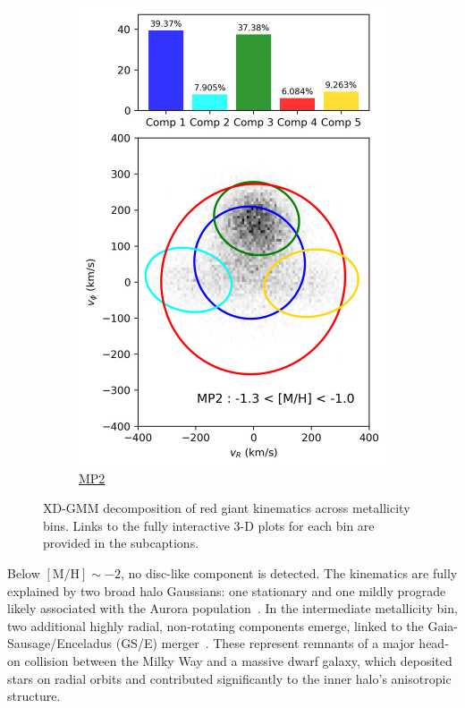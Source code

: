 \documentclass[a4paper,10pt]{article}
\begin{document}
\begin{multicols}{2}
\begin{figure}[H]
\begin{subfigure}[t]{0.24\linewidth}
    \includegraphics[width=\linewidth]{../figures/gmm_MP2.png}
    \caption{\href{https://raw.githack.com/raunaq-rai/Disentangling-the-Milky-Way-using-GMM/main/figures/MP2\_\_-1.3\%5BM\_H\%5D-1.0.html}{MP2}}
    \label{fig:gmm_mp2}
  \end{subfigure}

  \caption{XD-GMM decomposition of red giant kinematics across metallicity bins. Links to the fully interactive 3-D plots for each bin are provided in the subcaptions.}
  \label{fig:gmm_zhang}
\end{figure}


Below $\mathrm{[M/H]} \sim -2$, no disc-like component is detected. The kinematics are fully 
explained by two broad halo Gaussians: one stationary and one mildly prograde likely associated 
with the Aurora population~\cite{Belokurov2022}. In the intermediate metallicity bin, two 
additional highly radial, non-rotating components emerge, linked to the 
Gaia-Sausage/Enceladus (GS/E) merger~\cite{Belokurov2018}. These represent remnants of a 
major head-on collision between the Milky Way and a massive dwarf galaxy, which deposited stars 
on radial orbits and contributed significantly to the inner halo's anisotropic structure.


\end{multicols}
\end{document}
